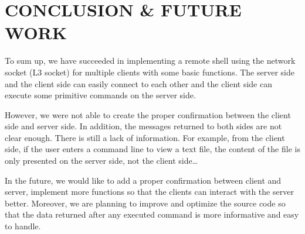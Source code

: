 \newpage
\vspace{6cm}

\section{CONCLUSION \& FUTURE WORK}
\hspace{0.6cm} To sum up, we have succeeded in implementing a remote shell using the network socket (L3 socket) for multiple clients with some basic functions. The server side and the client side can easily connect to each other and the client side can execute some primitive commands on the server side.

\vspace{0.9cm} However, we were not able to create the proper confirmation between the client side and server side. In addition, the messages returned to both sides are not clear enough. There is still a lack of information. For example, from the client side, if the user enters a command line to view a text file, the content of the file is only presented on the server side, not the client side…

\vspace{0.9cm} In the future, we would like to add a proper confirmation between client and server, implement more functions so that the clients can interact with the server better. Moreover, we are planning to improve and optimize the source code so that the data returned after any executed command is more informative and easy to handle. 